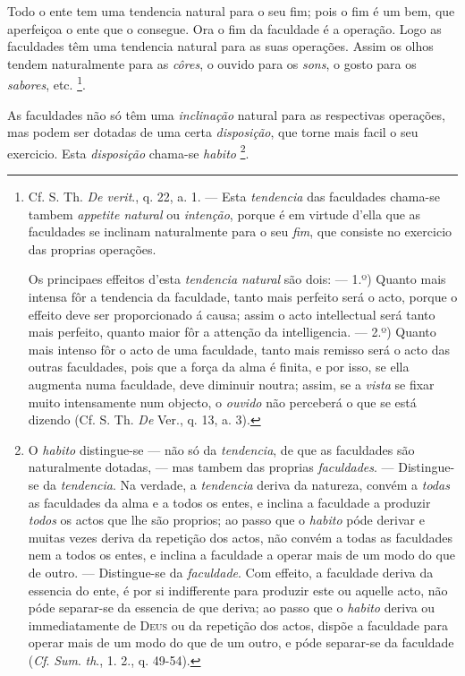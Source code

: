 
 
Todo o ente tem uma tendencia natural para o seu fim; pois o fim é um bem, que aperfeiçoa o ente que o consegue. Ora o fim da faculdade é a operação. Logo as faculdades têm uma tendencia natural para as suas operações. Assim os olhos tendem naturalmente para as \emph{côres}, o ouvido para os \emph{sons}, o gosto para os \emph{sabores}, etc. \footnote{Cf. S. Th. \emph{De verit}., q. 22, a. 1. --- Esta \emph{tendencia} das faculdades chama-se tambem \emph{appetite natural} ou \emph{intenção}, porque é em virtude d'ella que as faculdades se inclinam naturalmente para o seu \emph{fim}, que consiste no exercicio das proprias operações.\par Os principaes effeitos d'esta \emph{tendencia natural} são dois: --- 1.º) Quanto mais intensa fôr a tendencia da faculdade, tanto mais perfeito será o acto, porque o effeito deve ser proporcionado á causa; assim o acto intellectual será tanto mais perfeito, quanto maior fôr a attenção da intelligencia. --- 2.º) Quanto mais intenso fôr o acto de uma faculdade, tanto mais remisso será o acto das outras faculdades, pois que a força da alma é finita, e por isso, se ella augmenta numa faculdade, deve diminuir noutra; assim, se a \emph{vista} se fixar muito intensamente num objecto, o \emph{ouvido} não perceberá o que se está dizendo (Cf. S. Th. \emph{De} Ver., q. 13, a. 3).}.


As faculdades não só têm uma \emph{inclinação} natural para as respectivas operações, mas   podem ser dotadas de uma certa \emph{disposição}, que torne mais facil o seu exercicio. Esta \emph{disposição} chama-se \emph{habito} \footnote{O \emph{habito} distingue-se --- não só da \emph{tendencia}, de que as faculdades são naturalmente dotadas, --- mas tambem das proprias \emph{faculdades}. --- Distingue-se da \emph{tendencia}. Na verdade, a \emph{tendencia} deriva da natureza, convém a \emph{todas} as faculdades da alma e a todos os entes, e inclina a faculdade a produzir \emph{todos} os actos que lhe são proprios; ao passo que o \emph{habito} póde derivar e muitas vezes deriva da repetição dos actos, não convém a todas as faculdades nem a todos os entes, e inclina a faculdade a operar mais de um modo do que de outro. --- Distingue-se da \emph{faculdade}. Com effeito, a faculdade deriva da essencia do ente, é por si indifferente para produzir este ou aquelle acto, não póde separar-se da essencia de que deriva; ao passo que o \emph{habito} deriva ou immediatamente de \textsc{Deus} ou da repetição dos actos, dispõe a faculdade para operar mais de um modo do que de um outro, e póde separar-se da faculdade (\emph{Cf}. \emph{Sum}. \emph{th}., 1. 2., q. 49-54).}.

